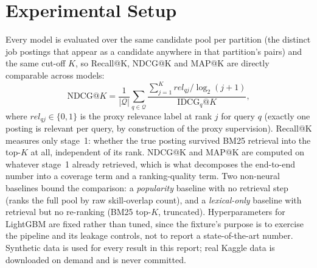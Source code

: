 \section{Experimental Setup}
Every model is evaluated over the same candidate pool per partition (the
distinct job postings that appear as a candidate anywhere in that
partition's pairs) and the same cut-off $K$, so Recall@K, NDCG@K and MAP@K
are directly comparable across models:
\[
\mathrm{NDCG}@K=\frac{1}{|\mathcal{Q}|}\sum_{q\in\mathcal{Q}}
\frac{\sum_{j=1}^K rel_{qj}/\log_2(j+1)}{\mathrm{IDCG}_q@K},
\]
where $rel_{qj}\in\{0,1\}$ is the proxy relevance label at rank $j$ for
query $q$ (exactly one posting is relevant per query, by construction of
the proxy supervision). Recall@K measures only stage~1: whether the true
posting survived BM25 retrieval into the top-$K$ at all, independent of its
rank. NDCG@K and MAP@K are computed on whatever stage~1 already retrieved,
which is what decomposes the end-to-end number into a coverage term and a
ranking-quality term. Two non-neural baselines bound the comparison: a
\emph{popularity} baseline with no retrieval step (ranks the full pool by
raw skill-overlap count), and a \emph{lexical-only} baseline with retrieval
but no re-ranking (BM25 top-$K$, truncated). Hyperparameters for LightGBM
are fixed rather than tuned, since the fixture's purpose is to exercise the
pipeline and its leakage controls, not to report a state-of-the-art number.
Synthetic data is used for every result in this report; real Kaggle data is
downloaded on demand and is never committed.
